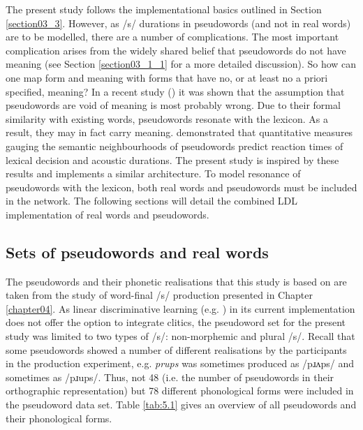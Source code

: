 The present study follows the implementational basics outlined in Section \ref{section03_3}. However, as /s/ durations in pseudowords (and not in real words) are to be modelled, there are a number of complications. The most important complication arises from the widely shared belief that pseudowords do not have meaning (see Section \ref{section03_1_1} for a more detailed discussion). So how can one map form and meaning with forms that have no, or at least no a priori specified, meaning? In a recent study (\cite{Chuang2021}) it was shown that the assumption that pseudowords are void of meaning is most probably wrong. Due to their formal similarity with existing words, pseudowords resonate with the lexicon. As a result, they may in fact carry meaning. \citet{Chuang2021} demonstrated that quantitative measures gauging the semantic neighbourhoods of pseudowords predict reaction times of lexical decision and acoustic durations. The present study is inspired by these results and implements a similar architecture. To model resonance of pseudowords with the lexicon, both real words and pseudowords must be included in the network. The following sections will detail the combined LDL implementation of real words and pseudowords.

\subsection{Sets of pseudowords and real words}\label{section05_1_2}

The pseudowords and their phonetic realisations that this study is based on are taken from the study of word-final /s/ production presented in Chapter \ref{chapter04}. As linear discriminative learning (e.g. \cite{Baayen2019}) in its current implementation does not offer the option to integrate clitics, the pseudoword set for the present study was limited to two types of /s/: non-morphemic and plural /s/. Recall that some pseudowords showed a number of different realisations by the participants in the production experiment, e.g. \textit{prups} was sometimes produced as /pɹʌps/ and sometimes as /pɹups/. Thus, not 48 (i.e. the number of pseudowords in their orthographic representation) but 78 different phonological forms were included in the pseudoword data set. Table \ref{tab:5.1} gives an overview of all pseudowords and their phonological forms.

